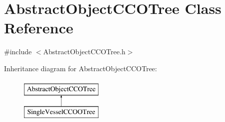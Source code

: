 \hypertarget{class_abstract_object_c_c_o_tree}{}\section{Abstract\+Object\+C\+C\+O\+Tree Class Reference}
\label{class_abstract_object_c_c_o_tree}


{\ttfamily \#include $<$Abstract\+Object\+C\+C\+O\+Tree.\+h$>$}

Inheritance diagram for Abstract\+Object\+C\+C\+O\+Tree\+:\begin{figure}[H]
\begin{center}
\leavevmode
\includegraphics[height=2.000000cm]{d5/df4/class_abstract_object_c_c_o_tree}
\end{center}
\end{figure}
